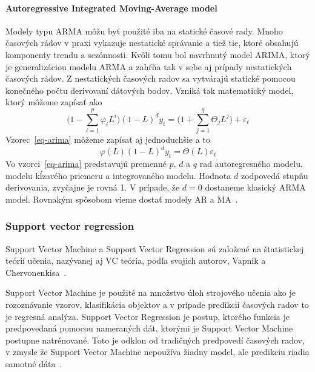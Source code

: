 \documentclass[a4paper,slovak,12pt,appendix]{article}
\begin{document}
\paragraph{Autoregressive Integrated Moving-Average model}
Modely typu ARMA môžu byť použité iba na statické časové rady. Mnoho časových
rádov v praxi vykazuje nestatické správanie a tiež tie, ktoré obsahujú
komponenty trendu a sezónnosti. Kvôli tomu bol navrhnutý model ARIMA, ktorý je
generalizáciou modelu ARMA a zahŕňa tak v sebe aj prípady nestatických časových
rádov. Z nestatických časových radov sa vytvárajú statické pomocou konečného
počtu derivovaní dátových bodov. Vzniká tak matematický model, ktorý môžeme
zapísať ako
\begin{equation}
  \Big( 1 - \sum_{i=1}^{p} \varphi_i L^i \Big) (1-L)^d y_t = \Big( 1 + \sum_{j=1}^{q} \Theta_j L^j \Big) + \varepsilon_t
  \label{eq-arima}
\end{equation}
Vzorec~\ref{eq-arima} môžeme zapísať aj jednoduchšie a to
\begin{equation}
  \varphi(L) (1-L)^d y_t = \Theta(L) \varepsilon_t
  \label{eq-arima-short}
\end{equation}
Vo vzorci~\ref{eq-arima} predstavujú premenné $p$, $d$ a $q$ rad autoregresného
modelu, modelu kĺzavého priemeru a integrovaného modelu. Hodnota $d$ zodpovedá
stupňu derivovania, zvyčajne je rovná 1. V prípade, že $d=0$ dostaneme klasický
ARMA model. Rovnakým spôsobom vieme dostať modely AR a MA~\cite{Agrawal2013}.


\subsubsection{Support vector regression}
Support Vector Machine a Support Vector Regression sú založené na štatistickej
teórií učenia, nazývanej aj VC teória, podľa svojich autorov, Vapnik
a Chervonenkisa~\cite{Sapankevych2009}.

Support Vector Machine je použité na množstvo úloh strojového učenia ako je
rozoznávanie vzorov, klasifikácia objektov a v prípade predikcií časových
radov to je regresná analýza. Support Vector Regression je postup, ktorého
funkcia je predpovedaná pomocou nameraných dát, ktorými je Support Vector
Machine postupne natrénované. Toto je odklon od tradičných predpovedí časových
radov, v zmysle že Support Vector Machine nepoužíva žiadny model, ale
predikciu riadia samotné dáta~\cite{Sapankevych2009}.
\end{document}
